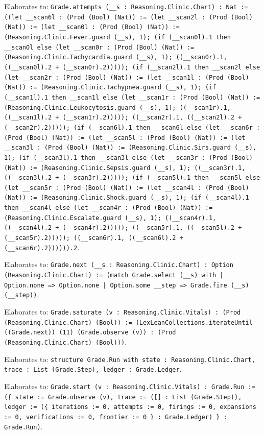 \documentclass[11pt]{article}
\begin{document}
\noindent Elaborates to: \texttt{Grade.attempts (\_\_s : Reasoning.Clinic.Chart) : Nat := ((let \_\_scan6l : (Prod (Bool) (Nat)) := (let \_\_scan2l : (Prod (Bool) (Nat)) := (let \_\_scan0l : (Prod (Bool) (Nat)) := (Reasoning.Clinic.Fever.guard (\_\_s), 1); (if (\_\_scan0l).1 then \_\_scan0l else (let \_\_scan0r : (Prod (Bool) (Nat)) := (Reasoning.Clinic.Tachycardia.guard (\_\_s), 1); ((\_\_scan0r).1, ((\_\_scan0l).2 + (\_\_scan0r).2))))); (if (\_\_scan2l).1 then \_\_scan2l else (let \_\_scan2r : (Prod (Bool) (Nat)) := (let \_\_scan1l : (Prod (Bool) (Nat)) := (Reasoning.Clinic.Tachypnea.guard (\_\_s), 1); (if (\_\_scan1l).1 then \_\_scan1l else (let \_\_scan1r : (Prod (Bool) (Nat)) := (Reasoning.Clinic.Leukocytosis.guard (\_\_s), 1); ((\_\_scan1r).1, ((\_\_scan1l).2 + (\_\_scan1r).2))))); ((\_\_scan2r).1, ((\_\_scan2l).2 + (\_\_scan2r).2))))); (if (\_\_scan6l).1 then \_\_scan6l else (let \_\_scan6r : (Prod (Bool) (Nat)) := (let \_\_scan5l : (Prod (Bool) (Nat)) := (let \_\_scan3l : (Prod (Bool) (Nat)) := (Reasoning.Clinic.Sirs.guard (\_\_s), 1); (if (\_\_scan3l).1 then \_\_scan3l else (let \_\_scan3r : (Prod (Bool) (Nat)) := (Reasoning.Clinic.Sepsis.guard (\_\_s), 1); ((\_\_scan3r).1, ((\_\_scan3l).2 + (\_\_scan3r).2))))); (if (\_\_scan5l).1 then \_\_scan5l else (let \_\_scan5r : (Prod (Bool) (Nat)) := (let \_\_scan4l : (Prod (Bool) (Nat)) := (Reasoning.Clinic.Shock.guard (\_\_s), 1); (if (\_\_scan4l).1 then \_\_scan4l else (let \_\_scan4r : (Prod (Bool) (Nat)) := (Reasoning.Clinic.Escalate.guard (\_\_s), 1); ((\_\_scan4r).1, ((\_\_scan4l).2 + (\_\_scan4r).2))))); ((\_\_scan5r).1, ((\_\_scan5l).2 + (\_\_scan5r).2))))); ((\_\_scan6r).1, ((\_\_scan6l).2 + (\_\_scan6r).2)))))).2}.\par
\noindent Elaborates to: \texttt{Grade.next (\_\_s : Reasoning.Clinic.Chart) : Option (Reasoning.Clinic.Chart) := (match Grade.select (\_\_s) with | Option.none => Option.none | Option.some \_\_step => Grade.fire (\_\_s) (\_\_step))}.\par
\noindent Elaborates to: \texttt{Grade.saturate (v : Reasoning.Clinic.Vitals) : (Prod (Reasoning.Clinic.Chart) (Bool)) := (LexLeanCollections.iterateUntil ((Grade.next)) (11) (Grade.observe (v)) : (Prod (Reasoning.Clinic.Chart) (Bool)))}.\par
\noindent Elaborates to: \texttt{structure Grade.Run with state : Reasoning.Clinic.Chart, trace : List (Grade.Step), ledger : Grade.Ledger}.\par
\noindent Elaborates to: \texttt{Grade.start (v : Reasoning.Clinic.Vitals) : Grade.Run := (\{ state := Grade.observe (v), trace := ([] : List (Grade.Step)), ledger := (\{ iterations := 0, attempts := 0, firings := 0, expansions := 0, verifications := 0, frontier := 0 \} : Grade.Ledger) \} : Grade.Run)}.\par
\end{document}
